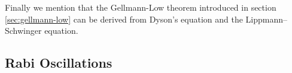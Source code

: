 Finally we mention that the Gellmann-Low theorem introduced in section \ref{sec:gellmann-low} can be derived from Dyson's equation and the Lippmann--Schwinger equation.




\subsection{Rabi Oscillations}

